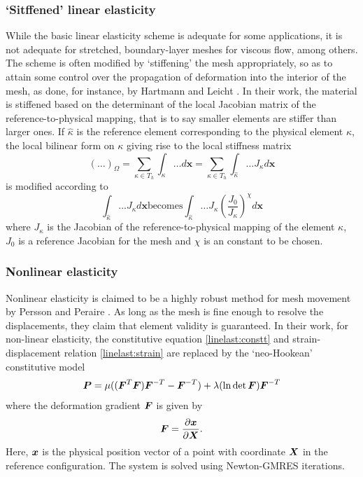  \subsubsection{`Sitffened' linear elasticity}
 \label{subsec:stiffelast}
 While the basic linear elasticity scheme is adequate for some applications, it is not adequate for stretched, boundary-layer meshes for viscous flow, among others. The scheme is often modified by `stiffening' the mesh appropriately, so as to attain some control over the propagation of deformation into the interior of the mesh, as done, for instance, by Hartmann and Leicht \cite{curve:hartmann}. In their work, the material is stiffened based on the determinant of the local Jacobian matrix of the reference-to-physical mapping, that is to say smaller elements are stiffer than larger ones. If $\hat{\kappa}$ is the reference element corresponding to the physical element $\kappa$, the local bilinear form on $\kappa$ giving rise to the local stiffness matrix 
 \begin{equation}
 (\dots)_\Omega = \sum_{\kappa \in T_h} \int_{\kappa} \dots d\mathbf{x} = \sum_{\kappa \in T_h} \int_{\hat{\kappa}} \dots J_\kappa d\mathbf{x}
 \end{equation}
 is modified according to
 \begin{equation}
\int_{\hat{\kappa}} \dots J_\kappa d\mathbf{x} \text{becomes} \int_{\hat{\kappa}} \dots J_\kappa \left(\frac{J_0}{J_\kappa}\right)^\chi d\mathbf{x}
 \end{equation}
 where $J_\kappa$ is the Jacobian of the reference-to-physical mapping of the element $\kappa$, $J_0$ is a reference Jacobian for the mesh and $\chi$ is an constant to be chosen.
 
 \subsubsection{Nonlinear elasticity}
 
 Nonlinear elasticity is claimed to be a highly robust method for mesh movement by Persson and Peraire \cite{curve:persson}. As long as the mesh is fine enough to resolve the displacements, they claim that element validity is guaranteed. In their work, for non-linear elasticity, the constitutive equation \eqref{linelast:constt} and strain-displacement relation \eqref{linelast:strain} are replaced by the `neo-Hookean' constitutive model
 \begin{equation}
 \boldsymbol{P} = \mu ((\boldsymbol{F}^T\boldsymbol{F})\boldsymbol{F}^{-T} - \boldsymbol{F}^{-T}) + \lambda(\ln \det\boldsymbol{F})\boldsymbol{F}^{-T}
 \end{equation}
 where the deformation gradient $\boldsymbol{F}$ is given by
 \[
 \boldsymbol{F} = \frac{\partial\boldsymbol{x}}{\partial\boldsymbol{X}}.
 \]
 Here, $\boldsymbol{x}$ is the physical position vector of a point with coordinate $\boldsymbol{X}$ in the reference configuration. The system is solved using Newton-GMRES iterations.
 
